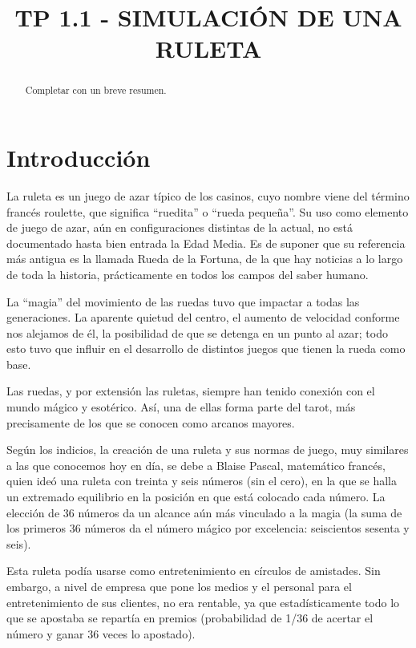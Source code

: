 


\title{TP 1.1 - SIMULACIÓN DE UNA RULETA}


\maketitle
\begin{abstract}
Completar con un breve resumen.
\end{abstract}


\section{Introducción}
La ruleta es un juego de azar típico de los casinos, cuyo nombre viene del término francés roulette, que significa ``ruedita'' o ``rueda pequeña''. Su uso como elemento de juego de azar, aún en configuraciones distintas de la actual, no está documentado hasta bien entrada la Edad Media. Es de suponer que su referencia más antigua es la llamada Rueda de la Fortuna, de la que hay noticias a lo largo de toda la historia, prácticamente en todos los campos del saber humano.

La ``magia'' del movimiento de las ruedas tuvo que impactar a todas las generaciones. La aparente quietud del centro, el aumento de velocidad conforme nos alejamos de él, la posibilidad de que se detenga en un punto al azar; todo esto tuvo que influir en el desarrollo de distintos juegos que tienen la rueda como base.

Las ruedas, y por extensión las ruletas, siempre han tenido conexión con el mundo mágico y esotérico. Así, una de ellas forma parte del tarot, más precisamente de los que se conocen como arcanos mayores.

Según los indicios, la creación de una ruleta y sus normas de juego, muy similares a las que conocemos hoy en día, se debe a Blaise Pascal, matemático francés, quien ideó una ruleta con treinta y seis números (sin el cero), en la que se halla un extremado equilibrio en la posición en que está colocado cada número. La elección de 36 números da un alcance aún más vinculado a la magia (la suma de los primeros 36 números da el número mágico por excelencia: seiscientos sesenta y seis).

Esta ruleta podía usarse como entretenimiento en círculos de amistades. Sin embargo, a nivel de empresa que pone los medios y el personal para el entretenimiento de sus clientes, no era rentable, ya que estadísticamente todo lo que se apostaba se repartía en premios (probabilidad de 1/36 de acertar el número y ganar 36 veces lo apostado).

